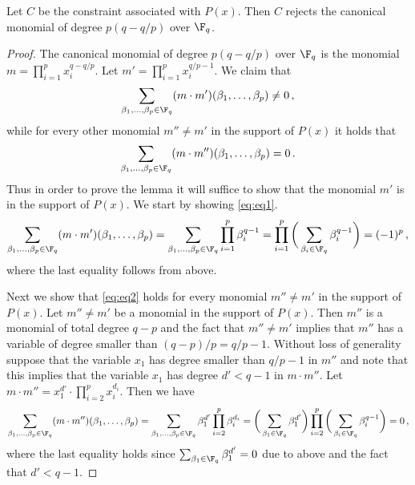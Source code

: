 \begin{lemma}\label{lem:tech-lem-reject}
Let $C$ be the constraint associated with $P(x)$. Then $C$ rejects the canonical monomial of degree $p(q-q/p)$ over $\F_q$.
\end{lemma}

\begin{proof}
The canonical monomial of degree $p(q-q/p)$ over $\F_q$ is the monomial $m = \prod_{i=1}^{p} x_i^{q-q/p}$. Let $m' = \prod_{i=1}^p x_i^{q/p-1}$.
We claim that
\begin{equation}\label{eq:eq1}
 \sum_{\beta_1,\ldots,\beta_p \in \F_q} (m \cdot m')(\beta_1,\ldots, \beta_p)  \neq 0\,,
 \end{equation}
 while for every other
monomial $m'' \neq m'$ in the support of
$P(x)$ it holds that
\begin{equation}\label{eq:eq2}
\sum_{\beta_1,\ldots,\beta_p \in \F_q}(m \cdot m'')(\beta_1,\ldots,\beta_p) =0\,.
\end{equation}
Thus in order to prove the lemma it will suffice to show that the monomial $m'$
is in the support of $P(x)$.
We start by showing \eqref{eq:eq1}. %
$$
\sum_{\beta_1,\ldots,\beta_p \in \F_q} (m \cdot m')(\beta_1,\ldots, \beta_p)   =  \sum_{\beta_1,\ldots,\beta_p \in \F_q}    \prod_{i=1}^{p} \beta_i^{q-1}
  = \prod_{i=1}^p \bigg( \sum_{\beta_i \in \F_q} \beta_i^{q-1} \bigg) =  (-1)^p  \,,
$$
where the last equality follows from  above.


Next we show that \eqref{eq:eq2} holds for every monomial $m'' \neq m'$ in the support of $P(x)$.
%
Let $m'' \neq m'$ be a monomial in the support of $P(x)$. Then
 $m''$ is a monomial of total degree $q-p$ and the fact that $m'' \neq m'$ implies that $m'' $ has a variable of degree smaller than
 $(q-p)/p = q/p - 1$. Without loss of generality suppose that the variable $x_1$ has degree smaller than  $q/p - 1$ in $m''$ and note that this implies
 that the variable $x_1$  has degree $d' < q-1$ in $m \cdot m''$. Let $m \cdot m'' = x_1^{d'} \cdot \prod_{i=2}^{p} x_i^{d_i}$. Then we have
%
%
%
%
\begin{equation*}
 \sum_{\beta_1,\ldots,\beta_p \in \F_q} (m \cdot m'')(\beta_1,\ldots, \beta_p)    =\sum_{\beta_1,\ldots,\beta_p \in \F_q}   \beta_1^{d'}  \prod_{i=2}^{p} \beta_i^{d_i} 
 =  \bigg(\sum_{\beta_1 \in \F_q} \beta_1^{d'} \bigg) \prod_{i=2}^p  \bigg(\sum_{\beta_i \in \F_q} \beta_i^{q-1} \bigg)= 0\,, 
\end{equation*}
where the last equality holds since $\sum_{\beta_1 \in \F_q} \beta_1^{d'}=0$ due to  above and the fact that $d' < q-1$.


\end{proof}
